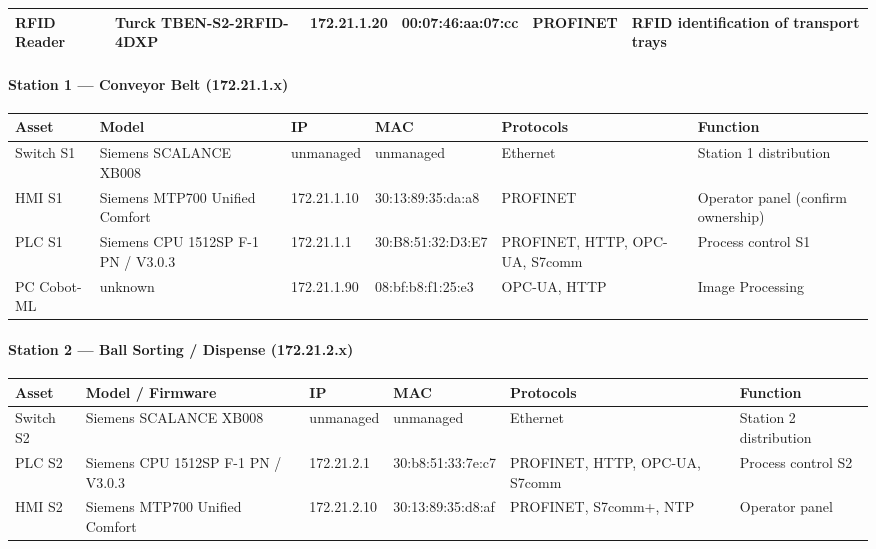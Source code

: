 {\begin{longtable}{L{2cm} L{2.1cm} L{2.1cm} L{2.6cm} L{2.4cm} L{4cm}}
    RFID Reader & Turck TBEN-S2-2RFID-4DXP & 172.21.1.20 &
    00:07:46:aa:07:cc & PROFINET & RFID identification of transport trays \\
\bottomrule
\end{longtable}


\paragraph{Station 1 --- Conveyor Belt (172.21.1.x)}
\begin{longtable}{L{2cm} L{2.1cm} L{2.1cm} L{2.6cm} L{2.4cm} L{4cm}}
\toprule
\textbf{Asset} & \textbf{Model} & \textbf{IP} & \textbf{MAC} & \textbf{Protocols} & \textbf{Function} \\
\midrule \endhead
    Switch S1 & Siemens SCALANCE XB008 & unmanaged & unmanaged & Ethernet &
    Station 1 distribution \\

    HMI S1 & Siemens MTP700 Unified Comfort & 172.21.1.10 & 30:13:89:35:da:a8 &
    PROFINET & Operator panel (confirm ownership) \\

    PLC S1 & Siemens CPU 1512SP F-1 PN / V3.0.3 & 172.21.1.1 &
    30:B8:51:32:D3:E7 & PROFINET, HTTP, OPC-UA, S7comm & Process control S1 \\

    PC Cobot-ML & unknown & 172.21.1.90 & 08:bf:b8:f1:25:e3 & OPC-UA, HTTP &
    Image Processing \\
\bottomrule
\end{longtable}

\paragraph{Station 2 --- Ball Sorting / Dispense (172.21.2.x)}
\begin{longtable}{L{2cm} L{2.1cm} L{2.1cm} L{2.6cm} L{2.4cm} L{4cm}}
\toprule
\textbf{Asset} & \textbf{Model / Firmware} & \textbf{IP} & \textbf{MAC} & \textbf{Protocols} & \textbf{Function} \\
\midrule \endhead
    Switch S2 & Siemens SCALANCE XB008 & unmanaged & unmanaged & Ethernet &
    Station 2 distribution \\

    PLC S2 & Siemens CPU 1512SP F-1 PN / V3.0.3 & 172.21.2.1 & 30:b8:51:33:7e:c7 & PROFINET, HTTP, OPC-UA, S7comm & Process control S2 \\

    HMI S2 & Siemens MTP700 Unified Comfort & 172.21.2.10 & 30:13:89:35:d8:af &
    PROFINET, S7comm+, NTP & Operator panel \\


\end{longtable}}
